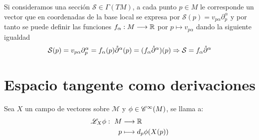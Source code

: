 Si consideramos una sección $\mathcal{S}\in\Gamma(TM)$, a cada punto $p\in M$ le corresponde un vector que en
coordenadas de la base local se expresa por $\mathcal{S}(p)=v_{p\alpha}\partial_p^\alpha$ y por tanto se puede definir
las funciones $f_\alpha:M\longrightarrow \mathbb{R}$ por $p\mapsto v_{p\alpha}$ dando la siguiente igualdad
\begin{equation}\label{eq:seccion-coordenadas-locales}
\mathcal{S}(p)=v_{p\alpha}\partial_p^\alpha=f_\alpha(p)\mathring{\partial}^\alpha(p)=(f_\alpha\mathring{\partial}^\alpha)(p)
  \Rightarrow
\mathcal{S}=f_\alpha\mathring{\partial}^\alpha
\end{equation}

\section{Espacio tangente como derivaciones}\label{sec:espacio-tangente-como-derivaciones}

\begin{definition}
  Sea $X$ un campo de vectores sobre $\mathcal{M}$ y $\phi\in\mathscr{C}^\infty(M)$, se llama  a:
  \begin{equation}
    \label{eq:derivada-lie-funcion-campo}
    \begin{alignedat}{1}
      \mathscr{L}_X \phi:\ M & \longrightarrow \mathbb{R} \\ p & \longmapsto d_p \phi(X(p))
    \end{alignedat}
  \end{equation}
\end{definition}

